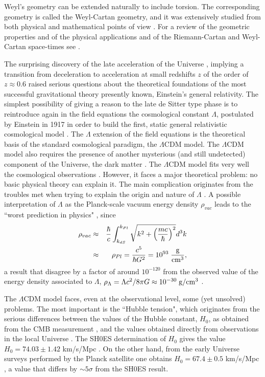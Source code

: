 \documentclass[aps,superscriptaddress, showpacs,preprintnumbers, superscriptaddress, nofootinbibt,twocolumn]{revtex4}
\def\bea{\begin{eqnarray}}
\def\eea{\end{eqnarray}}
\begin{document}
 Weyl's geometry can be extended naturally to include torsion. The corresponding geometry is called the Weyl-Cartan geometry, and it was extensively studied from both physical and mathematical points of view \cite{WC1,WC2,WC3,WC4,WC5,WC6,WC7,WC8, WC9}. For a review of the geometric properties and of the physical applications and of the Riemann-Cartan and Weyl-Cartan space-times  see \cite{Rev}.

 The surprising discovery of the late acceleration of the Universe \cite%
{1n,2n,3n,4n,acc}, implying a transition from deceleration to acceleration at small redshifts $z$ of the order of $z\approx 0.6$ raised serious questions about the theoretical foundations of the most successful gravitational theory presently known, Einstein's general relativity. The simplest possibility of giving a reason to the late de Sitter type phase is to reintroduce again in the field equations the cosmological constant $\Lambda$, postulated by Einstein in 1917 in order to build the first, static general relativistic cosmological model \cite{Ein}.  The $\Lambda$ extension of the field equations is the theoretical basis of the standard cosmological paradigm, the $\Lambda$CDM model. The $\Lambda$CDM model also requires the presence of another mysterious (and still undetected) component of the Universe, the dark matter \cite{Sal}. The $\Lambda$CDM model fits very well the cosmological observations \cite{C1,C2,C3, C4}. However, it faces a major theoretical problem:  no basic physical theory can explain it. The main complication originates from the troubles met when trying to explain the origin and nature of $\Lambda$ \cite{Wein1,Wein2, Wein3}. A possible interpretation of $\Lambda$ as the Planck-scale vacuum energy density $\rho _{vac}$ leads to the ``worst prediction in physics" \cite{Lake}, since
\bea
\rho _{vac}&\approx& \frac{\hbar}{c}\int _{k_{dS}}^{k_{Pl}}{\sqrt{k^2+\left(\frac{mc}{\hbar}\right)^2}d^3k}\nonumber\\
&\approx & \rho _{Pl}=\frac{c^5}{\hbar G^2}=10^{93}\; {\rm \frac{g}{cm^3}},
\eea
a result that disagree by a factor of around $10^{-120}$  from the observed value of the energy density associated to $\Lambda$, $\rho _{\Lambda}=\Lambda c^2/8\pi G\approx 10^{-30}\;{\rm g/cm^3}$ \cite{C3}.

The $\Lambda $CDM model faces, even at the observational level, some (yet unsolved) problems.  The most important is the ``Hubble tension", which originates from the serious differences between the values of the Hubble constant, $H_0$, as obtained from the CMB measurement \cite{C4}, and the values obtained directly from observations in the local Universe \cite{M1,M2,M3}. The SH0ES determination of $H_0$ gives the value
$H_0 = 74.03 \pm 1.42$ km/s/Mpc \cite{M1}. On the other hand, from the early Universe
surveys performed by the Planck satellite one obtains  $H_0 = 67.4 \pm 0.5$ km/s/Mpc \cite{C3}, a value that
differs by $\sim  5\sigma$ from the SH0ES result.
\end{document}
